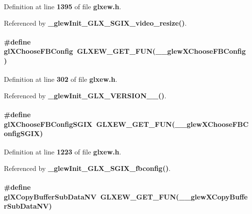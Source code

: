 Definition at line {\bf 1395} of file {\bf glxew.\+h}.



Referenced by {\bf \+\_\+glew\+Init\+\_\+\+G\+L\+X\+\_\+\+S\+G\+I\+X\+\_\+video\+\_\+resize()}.

\paragraph[{gl\+X\+Choose\+F\+B\+Config}]{\setlength{\rightskip}{0pt plus 5cm}\#define gl\+X\+Choose\+F\+B\+Config~{\bf G\+L\+X\+E\+W\+\_\+\+G\+E\+T\+\_\+\+F\+UN}({\bf \+\_\+\+\_\+glew\+X\+Choose\+F\+B\+Config})}\label{glxew_8h_a53bea768c8f19fd587e2284c9fbd8df4}


Definition at line {\bf 302} of file {\bf glxew.\+h}.



Referenced by {\bf \+\_\+glew\+Init\+\_\+\+G\+L\+X\+\_\+\+V\+E\+R\+S\+I\+O\+N\+\_\+\_()}.

\paragraph[{gl\+X\+Choose\+F\+B\+Config\+S\+G\+IX}]{\setlength{\rightskip}{0pt plus 5cm}\#define gl\+X\+Choose\+F\+B\+Config\+S\+G\+IX~{\bf G\+L\+X\+E\+W\+\_\+\+G\+E\+T\+\_\+\+F\+UN}({\bf \+\_\+\+\_\+glew\+X\+Choose\+F\+B\+Config\+S\+G\+IX})}\label{glxew_8h_ae133d3207d433bde7558a8306f8c4b7d}


Definition at line {\bf 1223} of file {\bf glxew.\+h}.



Referenced by {\bf \+\_\+glew\+Init\+\_\+\+G\+L\+X\+\_\+\+S\+G\+I\+X\+\_\+fbconfig()}.

\paragraph[{gl\+X\+Copy\+Buffer\+Sub\+Data\+NV}]{\setlength{\rightskip}{0pt plus 5cm}\#define gl\+X\+Copy\+Buffer\+Sub\+Data\+NV~{\bf G\+L\+X\+E\+W\+\_\+\+G\+E\+T\+\_\+\+F\+UN}({\bf \+\_\+\+\_\+glew\+X\+Copy\+Buffer\+Sub\+Data\+NV})}\label{glxew_8h_ab809502a0a8bc2611cdeed7da2209c45}


